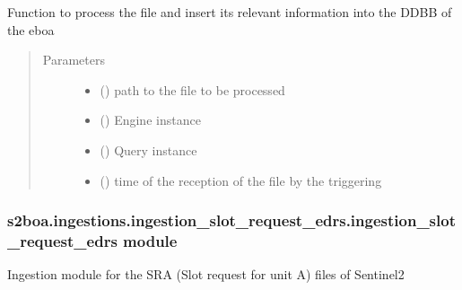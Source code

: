 \begin{fulllineitems}
\label{\detokenize{s2boa.ingestions:s2boa.ingestions.ingestion_rep_arc.ingestion_rep_arc.process_file}}
Function to process the file and insert its relevant information
into the DDBB of the eboa
\begin{quote}\begin{description}
\item[{Parameters}] \leavevmode\begin{itemize}
\item {} 
 () \textendash{} path to the file to be processed

\item {} 
 () \textendash{} Engine instance

\item {} 
 () \textendash{} Query instance

\item {} 
 () \textendash{} time of the reception of the file by the triggering

\end{itemize}

\end{description}\end{quote}

\end{fulllineitems}



\subsubsection{s2boa.ingestions.ingestion\_slot\_request\_edrs.ingestion\_slot\_request\_edrs module}
\label{\detokenize{s2boa.ingestions:module-s2boa.ingestions.ingestion_slot_request_edrs.ingestion_slot_request_edrs}}\label{\detokenize{s2boa.ingestions:s2boa-ingestions-ingestion-slot-request-edrs-ingestion-slot-request-edrs-module}}
Ingestion module for the SRA (Slot request for unit A) files of Sentinel\sphinxhyphen{}2

